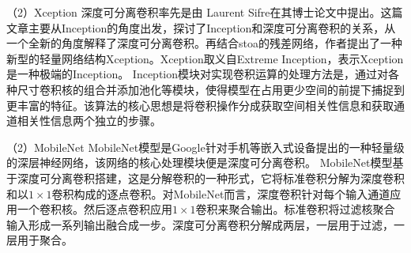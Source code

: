 （2）Xception
深度可分离卷积率先是由 Laurent Sifre在其博士论文中提出。这篇文章主要从Inception\cite{szegedy2015going}的角度出发，探讨了Inception和深度可分离卷积的关系，从一个全新的角度解释了深度可分离卷积。再结合stoa的残差网络\cite{he2016deep}，作者提出了一种新型的轻量网络结构Xception。Xception取义自Extreme Inception，表示Xception是一种极端的Inception。
Inception模块对实现卷积运算的处理方法是，通过对各种尺寸卷积核的组合并添加池化等模块，使得模型在占用更少空间的前提下捕捉到更丰富的特征。该算法的核心思想是将卷积操作分成获取空间相关性信息和获取通道相关性信息两个独立的步骤。

（2）MobileNet
MobileNet\cite{howard2017mobilenets}模型是Google针对手机等嵌入式设备提出的一种轻量级的深层神经网络，该网络的核心处理模块便是深度可分离卷积。
MobileNet模型基于深度可分离卷积搭建，这是分解卷积的一种形式，它将标准卷积分解为深度卷积和以$1\times1$卷积构成的逐点卷积。对MobileNet而言，深度卷积针对每个输入通道应用一个卷积核。然后逐点卷积应用$1\times1$卷积来聚合输出。标准卷积将过滤核聚合输入形成一系列输出融合成一步。深度可分离卷积分解成两层，一层用于过滤，一层用于聚合。





